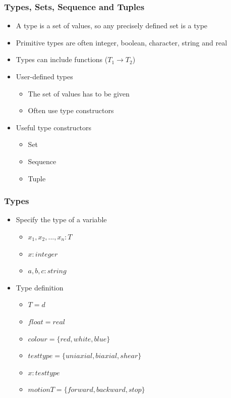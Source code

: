 \documentclass[t,12pt,numbers,fleqn]{beamer}
\begin{document}

\begin{frame}
\frametitle{Types, Sets, Sequence and Tuples}
\begin{itemize}
\item A type is a set of values, so any precisely defined set is a type
\item Primitive types are often integer, boolean, character, string
  and real
\item Types can include functions ($T_1 \rightarrow T_2$)
\item User-defined types
\begin{itemize}
\item The set of values has to be given
\item Often use type constructors
\end{itemize}
\item Useful type constructors
\begin{itemize}
\item Set
\item Sequence
\item Tuple
\end{itemize}
\end{itemize}
\end{frame}


\begin{frame}
\frametitle{Types}
\begin{itemize}
\item Specify the type of a variable
\begin{itemize}
\item $x_1, x_2, ..., x_n : T$
\item $x: integer$
\item $a, b, c: string$
\end{itemize}
\item Type definition
\begin{itemize}
\item $T = d$
\item $float = real$
\item $colour = \{red, white, blue \}$
\item $testtype = \{uniaxial, biaxial, shear \}$
\item $x: testtype$
\item $motionT = \{ forward, backward, stop \}$
\end{itemize}
\end{itemize}
\end{frame}
\end{document}
